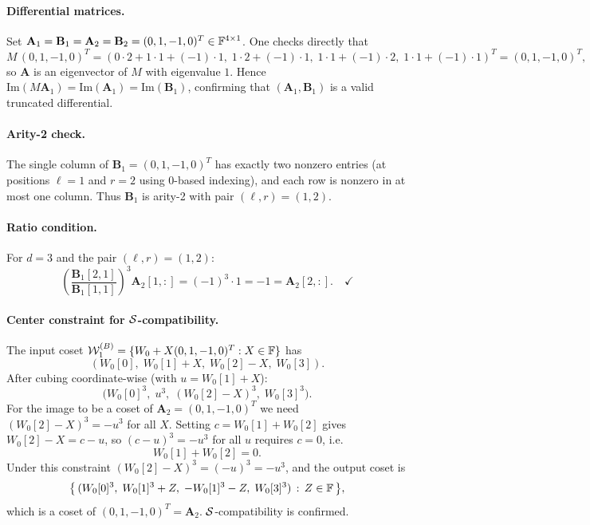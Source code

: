 \documentclass[11pt]{article}
\begin{document}
\paragraph{Differential matrices.}
Set $\mathbf{A}_1 = \mathbf{B}_1 = \mathbf{A}_2 = \mathbf{B}_2 = (0,1,-1,0)^T \in \mathbb{F}^{4\times 1}$.
One checks directly that
\[
    M\,(0,1,-1,0)^T = (0\cdot 2+1\cdot 1+(-1)\cdot 1, \; 1\cdot 2+(-1)\cdot 1, \;
                       1\cdot 1+(-1)\cdot 2, \; 1\cdot 1+(-1)\cdot 1)^T
    = (0,1,-1,0)^T,
\]
so $\mathbf{A}$ is an eigenvector of $M$ with eigenvalue $1$.  Hence
$\mathrm{Im}(M\mathbf{A}_1) = \mathrm{Im}(\mathbf{A}_1) = \mathrm{Im}(\mathbf{B}_1)$,
confirming that $(\mathbf{A}_1, \mathbf{B}_1)$ is a valid truncated differential.

\paragraph{Arity-2 check.}
The single column of $\mathbf{B}_1=(0,1,-1,0)^T$ has exactly two nonzero entries (at positions
$\ell=1$ and $r=2$ using 0-based indexing), and each row is nonzero in at most one column.
Thus $\mathbf{B}_1$ is arity-2 with pair $(\ell,r)=(1,2)$.

\paragraph{Ratio condition.}
For $d=3$ and the pair $(\ell,r)=(1,2)$:
\[
    \left(\frac{\mathbf{B}_1[2,1]}{\mathbf{B}_1[1,1]}\right)^{\!3}\mathbf{A}_2[1,:]
    = (-1)^3 \cdot 1 = -1 = \mathbf{A}_2[2,:]. \quad\checkmark
\]

\paragraph{Center constraint for $\mathcal{S}$-compatibility.}
The input coset $\mathcal{W}^{(B)}_1 = \{W_0 + X(0,1,-1,0)^T : X\in\mathbb{F}\}$ has
\[
    (W_0[0],\; W_0[1]+X,\; W_0[2]-X,\; W_0[3]).
\]
After cubing coordinate-wise (with $u = W_0[1]+X$):
\[
    \bigl(W_0[0]^3,\;u^3,\;(W_0[2]-X)^3,\;W_0[3]^3\bigr).
\]
For the image to be a coset of $\mathbf{A}_2=(0,1,-1,0)^T$ we need $(W_0[2]-X)^3 = -u^3$ for all $X$.
Setting $c = W_0[1]+W_0[2]$ gives $W_0[2]-X = c-u$, so $(c-u)^3=-u^3$ for all $u$ requires $c=0$, i.e.
\[
    W_0[1] + W_0[2] = 0.
\]
Under this constraint $(W_0[2]-X)^3 = (-u)^3 = -u^3$, and the output coset is
\[
    \bigl\{\,(W_0[0]^3,\;W_0[1]^3+Z,\;-W_0[1]^3-Z,\;W_0[3]^3)\,:\,Z\in\mathbb{F}\,\bigr\},
\]
which is a coset of $(0,1,-1,0)^T = \mathbf{A}_2$.  $\mathcal{S}$-compatibility is confirmed.
\end{document}
